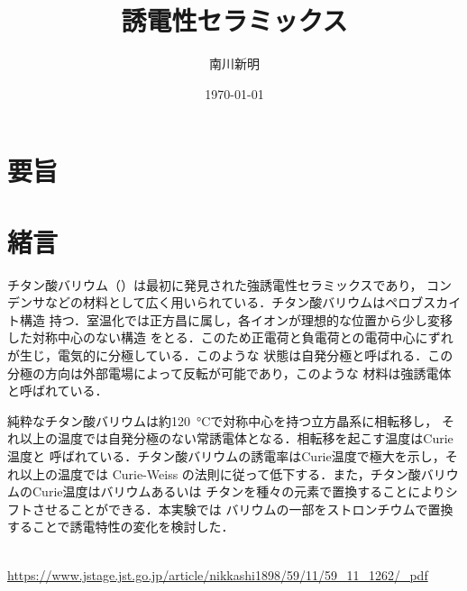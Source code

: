 \documentclass[uplatex, dvipdfmx, a4paper]{jsarticle}
\title{誘電性セラミックス}
\author{南川新明}
\date{\today}
\begin{document}
    \maketitle
    
    \section*{要旨}
    
    \section*{緒言}
        チタン酸バリウム（）は最初に発見された強誘電性セラミックスであり，
        コンデンサなどの材料として広く用いられている．チタン酸バリウムはペロブスカイト構造
        持つ．室温化では正方昌に属し，各イオンが理想的な位置から少し変移した対称中心のない構造
        をとる．このため正電荷と負電荷との電荷中心にずれが生じ，電気的に分極している．このような
        状態は自発分極と呼ばれる．この分極の方向は外部電場によって反転が可能であり，このような
        材料は強誘電体と呼ばれている．

        純粋なチタン酸バリウムは約\SI{120}{\celsius}で対称中心を持つ立方晶系に相転移し，
        それ以上の温度では自発分極のない常誘電体となる．相転移を起こす温度はCurie温度と
        呼ばれている．チタン酸バリウムの誘電率はCurie温度で極大を示し，それ以上の温度では
        Curie-Weiss の法則に従って低下する．また，チタン酸バリウムのCurie温度はバリウムあるいは
        チタンを種々の元素で置換することによりシフトさせることができる．本実験では
        バリウムの一部をストロンチウムで置換することで誘電特性の変化を検討した．


    \begin{thebibliography}{9}
            \\\url{https://www.jstage.jst.go.jp/article/nikkashi1898/59/11/59_11_1262/_pdf}\\
    \end{thebibliography}
\end{document}
